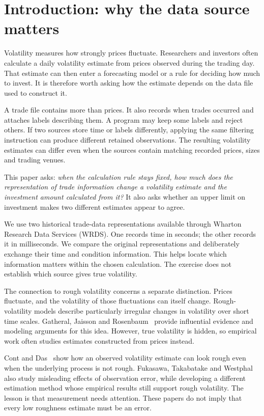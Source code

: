 \section{Introduction: why the data source matters}
Volatility measures how strongly prices fluctuate. Researchers and investors often calculate a daily volatility estimate from prices observed during the trading day. That estimate can then enter a forecasting model or a rule for deciding how much to invest. It is therefore worth asking how the estimate depends on the data file used to construct it.

A trade file contains more than prices. It also records when trades occurred and attaches labels describing them. A program may keep some labels and reject others. If two sources store time or labels differently, applying the same filtering instruction can produce different retained observations. The resulting volatility estimates can differ even when the sources contain matching recorded prices, sizes and trading venues.

This paper asks: \emph{when the calculation rule stays fixed, how much does the representation of trade information change a volatility estimate and the investment amount calculated from it?} It also asks whether an upper limit on investment makes two different estimates appear to agree.

We use two historical trade-data representations available through Wharton Research Data Services (WRDS). One records time in seconds; the other records it in milliseconds. We compare the original representations and deliberately exchange their time and condition information. This helps locate which information matters within the chosen calculation. The exercise does not establish which source gives true volatility.

The connection to rough volatility concerns a separate distinction. Prices fluctuate, and the volatility of those fluctuations can itself change. Rough-volatility models describe particularly irregular changes in volatility over short time scales. Gatheral, Jaisson and Rosenbaum~\cite{gjr} provide influential evidence and modeling arguments for this idea. However, true volatility is hidden, so empirical work often studies estimates constructed from prices instead.

Cont and Das~\cite{contdas} show how an observed volatility estimate can look rough even when the underlying process is not rough. Fukasawa, Takabatake and Westphal~\cite{ftw} also study misleading effects of observation error, while developing a different estimation method whose empirical results still support rough volatility. The lesson is that measurement needs attention. These papers do not imply that every low roughness estimate must be an error.

